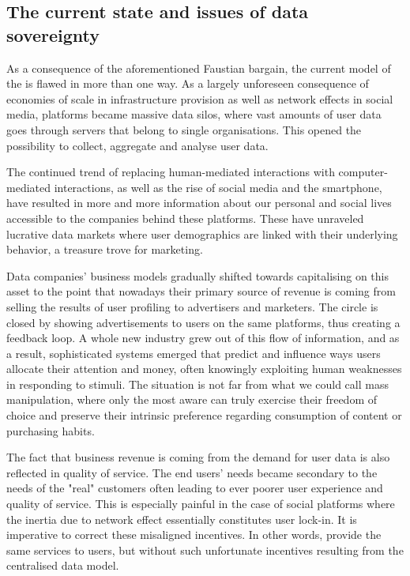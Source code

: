 \subsection{The current state and issues of data sovereignty \statusgreen }\label{sec:data-sovereignty}

As a consequence of the aforementioned Faustian bargain, the current model of the  is flawed in more than one way. As a largely unforeseen consequence of economies of scale in infrastructure provision as well as network effects in social media, platforms became massive data silos, where vast amounts of user data goes through servers that belong to single organisations. This opened the possibility to collect, aggregate and analyse user data. 

The continued trend of replacing human-mediated interactions with computer-mediated interactions, as well as the rise of social media and the smartphone, have resulted in more and more information about our personal and social lives accessible to the companies behind these platforms. These have unraveled lucrative data markets where user demographics are linked with their underlying behavior, a treasure trove for marketing.



Data companies' business models gradually shifted towards capitalising on this asset to the point that nowadays their primary source of revenue is coming from selling the results of user profiling to advertisers and marketers. The circle is closed by showing advertisements to users on the same platforms, thus creating a feedback loop. A whole new industry grew out of this flow of information, and as a result, sophisticated systems emerged that predict and influence ways users allocate their attention and money, often knowingly exploiting human weaknesses in responding to stimuli. The situation is not far from what we could call mass manipulation, where only the most aware can truly exercise their freedom of choice and preserve their intrinsic preference regarding consumption of content or purchasing habits.

The fact that business revenue is coming from the demand for user data is also reflected in quality of service. The end users' needs became secondary to the needs of the "real" customers often leading to ever poorer user experience and quality of service. This is especially painful in the case of social platforms where the inertia due to network effect essentially constitutes user lock-in. It is imperative to correct these misaligned incentives. In other words, provide the same services to users, but without such unfortunate incentives resulting from the centralised data model.

